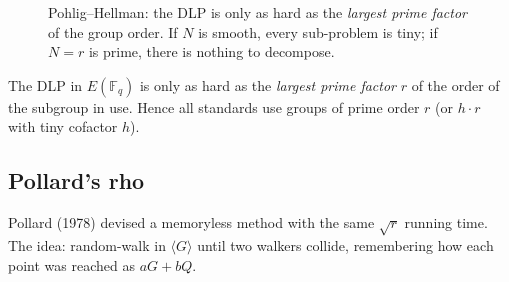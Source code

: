 \documentclass[11pt,a4paper,oneside]{book}
\theoremstyle{plain}
\theoremstyle{definition}
\theoremstyle{remark}
\newcommand{\Fq}{\mathbb{F}_q}
\begin{document}
\begin{figure}[ht]
\centering
{}
\caption{Pohlig--Hellman: the DLP is only as hard as the \emph{largest prime factor} of the group order. If $N$ is smooth, every sub-problem is tiny; if $N=r$ is prime, there is nothing to decompose.}
\label{fig:PH}
\end{figure}

\begin{warningbox}
The DLP in $E(\Fq)$ is only as hard as the \emph{largest prime factor} $r$ of the order of the subgroup in use. Hence all standards use groups of prime order $r$ (or $h\cdot r$ with tiny cofactor $h$).
\end{warningbox}

\subsection{Pollard's rho}

Pollard (1978) devised a memoryless method with the same $\sqrt r$ running time. The idea: random-walk in $\langle G\rangle$ until two walkers collide, remembering how each point was reached as $aG+bQ$.
\end{document}
